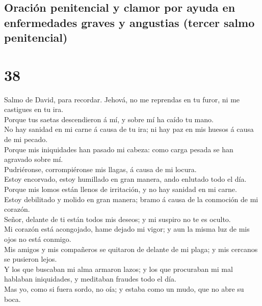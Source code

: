 \hypertarget{oraciuxf3n-penitencial-y-clamor-por-ayuda-en-enfermedades-graves-y-angustias-tercer-salmo-penitencial}{%
\subsection{Oración penitencial y clamor por ayuda en enfermedades
graves y angustias (tercer salmo
penitencial)}\label{oraciuxf3n-penitencial-y-clamor-por-ayuda-en-enfermedades-graves-y-angustias-tercer-salmo-penitencial}}

\hypertarget{section-37}{%
\section{38}\label{section-37}}

 Salmo de David, para recordar. Jehová, no me reprendas en
tu furor, ni me castigues en tu ira.\\
 Porque tus saetas descendieron á mí, y sobre mí ha caído
tu mano.\\
 No hay sanidad en mi carne á causa de tu ira; ni hay paz
en mis huesos á causa de mi pecado.\\
 Porque mis iniquidades han pasado mi cabeza: como carga
pesada se han agravado sobre mí.\\
 Pudriéronse, corrompiéronse mis llagas, á causa de mi
locura.\\
 Estoy encorvado, estoy humillado en gran manera, ando
enlutado todo el día.\\
 Porque mis lomos están llenos de irritación, y no hay
sanidad en mi carne.\\
 Estoy debilitado y molido en gran manera; bramo á causa
de la conmoción de mi corazón.\\
 Señor, delante de ti están todos mis deseos; y mi suspiro
no te es oculto.\\
 Mi corazón está acongojado, hame dejado mi vigor; y aun
la misma luz de mis ojos no está conmigo.\\
 Mis amigos y mis compañeros se quitaron de delante de mi
plaga; y mis cercanos se pusieron lejos.\\
 Y los que buscaban mi alma armaron lazos; y los que
procuraban mi mal hablaban iniquidades, y meditaban fraudes todo el
día.\\
 Mas yo, como si fuera sordo, no oía; y estaba como un
mudo, que no abre su boca.\\
